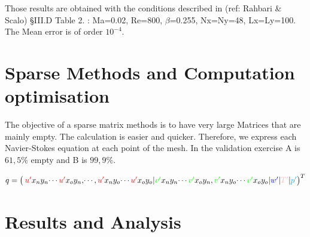 \documentclass[ border=0pt, a4paper, 11pt]{article}
\numberwithin{equation}{section}
\numberwithin{equation}{section}
\renewcommand{\u}{\textcolor{red}{u'}}
\renewcommand{\v}{\textcolor{green}{v'}}
\newcommand{\w}{\textcolor{blue}{w'}}
\newcommand{\p}{\textcolor{cyan}{p'}}
\newcommand{\T}{\textcolor{pink}{T'}}
\begin{document}
 Those results are obtained with the conditions described in (ref: Rahbari & Scalo) \S III.D Table 2. : Ma=0.02, Re=800, $\beta$=0.255, Nx=Ny=48, Lx=Ly=100. The Mean error is of order $10^{-4}$.


\section{Sparse Methods and Computation optimisation}

The objective of a sparse matrix methods is to have very large Matrices that are mainly empty. The calculation is easier and quicker. Therefore, we express each Navier-Stokes equation at each point of the mesh.  In the validation exercise A is $61,5\%$ empty and B is $99,9\%$.

\begin{equation*}
q = \begin{pmatrix} \: 
\u x_{n}y_{n} \dotsi \u x_{o}y_{n},
\dotsi,
\u x_{n}y_{o} \dotsi \u x_{o}y_{o}|
\v x_{n}y_{n} \dotsi \v x_{o}y_{n},
\v x_{n}y_{o} \dotsi \v x_{o}y_{o}|
\w |
\T |
\p 
\end{pmatrix}^T   
\end{equation*}


\section{Results and Analysis}
\newpage


\nocite{*}
\end{document}
